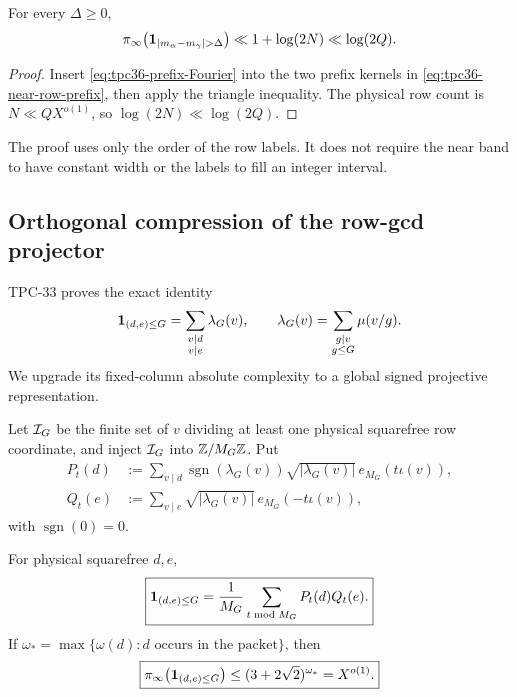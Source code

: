 \begin{proposition}
\label{prop:tpc36-near-row-projective}
For every \(\Delta\ge0\),
\begin{equation}
 \pinf\!\left(\one_{|m_\alpha-m_\gamma|>\Delta}\right)
 \ll1+\log(2N)\ll\log(2Q).
 \label{eq:tpc36-near-row-projective}
\end{equation}
\end{proposition}

\begin{proof}
Insert \eqref{eq:tpc36-prefix-Fourier} into the two prefix kernels in
\eqref{eq:tpc36-near-row-prefix}, then apply the triangle inequality.
The physical row count is \(N\ll QX^{o(1)}\), so
\(\log(2N)\ll\log(2Q)\).
\end{proof}

The proof uses only the order of the row labels.  It does not require the
near band to have constant width or the labels to fill an integer interval.

\subsection{Orthogonal compression of the row-gcd projector}

TPC-33 proves the exact identity
\begin{equation}
 \mathbf 1_{(d,e)\le G}
 =\sum_{\substack{v\mid d\\v\mid e}}\lambda_G(v),
 \qquad
 \lambda_G(v)=\sum_{\substack{g\mid v\\g\le G}}\mu(v/g).
 \label{eq:tpc36-gcd-projector}
\end{equation}
We upgrade its fixed-column absolute complexity to a global signed
projective representation.

Let \(\mathcal I_G\) be the finite set of \(v\) dividing at least one physical
squarefree row coordinate, and inject \(\mathcal I_G\) into
\(\mathbb Z/M_G\mathbb Z\).  Put
\begin{align}
 P_t(d)
 &:=\sum_{v\mid d}
 \operatorname{sgn}(\lambda_G(v))
 \sqrt{|\lambda_G(v)|}\,e_{M_G}(t\iota(v)),
 \label{eq:tpc36-gcd-P}\\
 Q_t(e)
 &:=\sum_{v\mid e}
 \sqrt{|\lambda_G(v)|}\,e_{M_G}(-t\iota(v)),
 \label{eq:tpc36-gcd-Q}
\end{align}
with \(\operatorname{sgn}(0)=0\).

\begin{theorem}
\label{thm:tpc36-global-gcd}
For physical squarefree \(d,e\),
\begin{equation}
 \boxed{
 \mathbf 1_{(d,e)\le G}
 =\frac1{M_G}\sum_{t\bmod M_G}P_t(d)Q_t(e).}
 \label{eq:tpc36-global-gcd-factorization}
\end{equation}
If
\(\omega_*=\max\{\omega(d):d\text{ occurs in the packet}\}\), then
\begin{equation}
 \boxed{
 \pi_{\infty}\!\left(\mathbf 1_{(d,e)\le G}\right)
 \le(3+2\sqrt2)^{\omega_*}=X^{o(1)}.}
 \label{eq:tpc36-global-gcd-cost}
\end{equation}
\end{theorem}

